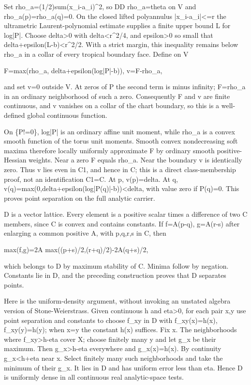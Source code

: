 \documentclass[11pt]{article}
\begin{document}
Set rho\_a=(1/2)sum(x\_i-a\_i)\textasciicircum{}2, so DD rho\_a=theta on V and rho\_a(p)=rho\_a(q)=0. On the closed lifted polyannulus |x\_i-a\_i|<=r the ultrametric Laurent-polynomial estimate supplies a finite upper bound L for log|P|. Choose delta>0 with delta<r\textasciicircum{}2/4, and epsilon>0 so small that delta+epsilon(L-b)<r\textasciicircum{}2/2. With a strict margin, this inequality remains below rho\_a in a collar of every tropical boundary face. Define on V

F=max(rho\_a, delta+epsilon(log|P|-b)),
v=F-rho\_a,

and set v=0 outside V. At zeros of P the second term is minus infinity; F=rho\_a in an ordinary neighborhood of such a zero. Consequently F and v are finite continuous, and v vanishes on a collar of the chart boundary, so this is a well-defined global continuous function.

On \{P!=0\}, log|P| is an ordinary affine unit moment, while rho\_a is a convex smooth function of the torus unit moments. Smooth convex nondecreasing soft maxima therefore locally uniformly approximate F by ordinary smooth positive-Hessian weights. Near a zero F equals rho\_a. Near the boundary v is identically zero. Thus v lies even in C1, and hence in C; this is a direct class-membership proof, not an identification C1=C. At p, v(p)=delta. At q, v(q)=max(0,delta+epsilon(log|P(q)|-b))<delta, with value zero if P(q)=0. This proves point separation on the full analytic carrier.

D is a vector lattice. Every element is a positive scalar times a difference of two C members, since C is convex and contains constants. If f=A(p-q), g=A(r-s) after enlarging a common positive A, with p,q,r,s in C, then

max(f,g)=2A max((p+s)/2,(r+q)/2)-2A(q+s)/2,

which belongs to D by maximum stability of C. Minima follow by negation. Constants lie in D, and the preceding construction proves that D separates points.

Here is the uniform-density argument, without invoking an unstated algebra version of Stone-Weierstrass. Given continuous h and eta>0, for each pair x,y use point separation and constants to choose f\_xy in D with f\_xy(x)=h(x), f\_xy(y)=h(y); when x=y the constant h(x) suffices. Fix x. The neighborhoods where f\_xy>h-eta cover X; choose finitely many y and let g\_x be their maximum. Then g\_x>h-eta everywhere and g\_x(x)=h(x). By continuity g\_x<h+eta near x. Select finitely many such neighborhoods and take the minimum of their g\_x. It lies in D and has uniform error less than eta. Hence D is uniformly dense in all continuous real analytic-space tests.
\end{document}
